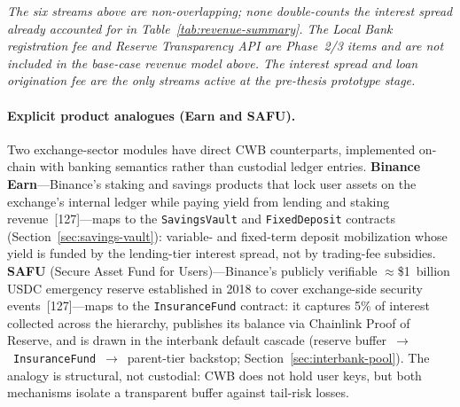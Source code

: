 \documentclass[12pt,a4paper]{report}
\begin{document}
\vspace{2pt}
\noindent\textit{\small The six streams above are non-overlapping; none double-counts the interest spread already accounted for in Table~\ref{tab:revenue-summary}. The Local Bank registration fee and Reserve Transparency API are Phase~2/3 items and are not included in the base-case revenue model above. The interest spread and loan origination fee are the only streams active at the pre-thesis prototype stage.}

\paragraph{Explicit product analogues (Earn and SAFU).}
Two exchange-sector modules have direct CWB counterparts, implemented on-chain with banking semantics rather than custodial ledger entries. \textbf{Binance Earn}---Binance's staking and savings products that lock user assets on the exchange's internal ledger while paying yield from lending and staking revenue~[127]---maps to the \texttt{SavingsVault} and \texttt{FixedDeposit} contracts (Section~\ref{sec:savings-vault}): variable- and fixed-term deposit mobilization whose yield is funded by the lending-tier interest spread, not by trading-fee subsidies. \textbf{SAFU} (Secure Asset Fund for Users)---Binance's publicly verifiable $\approx$\$1~billion USDC emergency reserve established in 2018 to cover exchange-side security events~[127]---maps to the \texttt{InsuranceFund} contract: it captures 5\% of interest collected across the hierarchy, publishes its balance via Chainlink Proof of Reserve, and is drawn in the interbank default cascade (reserve buffer~$\to$~\texttt{InsuranceFund}~$\to$~parent-tier backstop; Section~\ref{sec:interbank-pool}). The analogy is structural, not custodial: CWB does not hold user keys, but both mechanisms isolate a transparent buffer against tail-risk losses.
\end{document}
